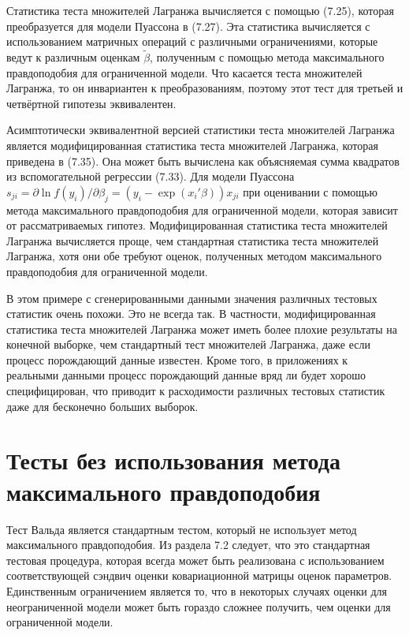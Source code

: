 Статистика теста множителей Лагранжа вычисляется с помощью (7.25), которая преобразуется для модели Пуассона в (7.27). Эта статистика вычисляется с использованием матричных операций с различными ограничениями, которые ведут к различным  оценкам $\tilde{\beta}$, полученным с помощью метода максимального правдоподобия для ограниченной модели. Что касается теста множителей Лагранжа, то он инвариантен к преобразованиям, поэтому этот тест для третьей и четвёртной гипотезы эквивалентен.

Асимптотически эквивалентной версией статистики теста множителей Лагранжа является модифицированная статистика теста множителей Лагранжа, которая приведена в (7.35). Она может быть вычислена как объясняемая сумма квадратов из вспомогательной регрессии (7.33). Для модели Пуассона $s_{ji} = \partial{\ln f(y_i)}/\partial{\beta}_j = (y_i - \exp(x_i'\beta))x_{ji}$ при оценивании с помощью метода максимального правдоподобия для ограниченной модели, которая зависит от рассматриваемых гипотез. Модифицированная статистика теста множителей Лагранжа вычисляется проще, чем стандартная статистика теста множителей Лагранжа, хотя они обе требуют оценок, полученных методом максимального правдоподобия для ограниченной модели.

В этом примере с сгенерированными данными значения различных тестовых статистик очень похожи. Это не всегда так. В частности, модифицированная статистика теста множителей Лагранжа может иметь более плохие результаты на конечной выборке, чем стандартный тест множителей Лагранжа, даже если процесс порождающий данные известен. Кроме того, в приложениях к реальными данными процесс порождающий данные вряд ли будет хорошо специфицирован, что приводит к расходимости различных тестовых статистик даже для бесконечно больших выборок.

\section{Тесты без использования метода максимального правдоподобия}

Тест Вальда является стандартным тестом, который не использует метод максимального правдоподобия. Из раздела 7.2 следует, что это стандартная тестовая процедура, которая всегда может быть реализована с использованием соответствующей сэндвич оценки ковариационной матрицы оценок параметров. Единственным ограничением является то, что в некоторых случаях оценки для неограниченной модели может быть гораздо сложнее получить, чем оценки для ограниченной модели.

